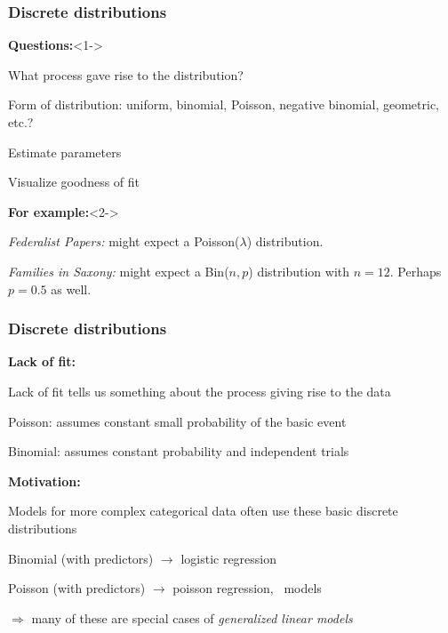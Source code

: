 \begin{frame}
  \frametitle{Discrete distributions}  

  \begin{block}{\large\bfseries Questions:}<1->
  	 \begin{itemize*}
  	 \item What process gave rise to the distribution?
  	 \item Form of distribution: uniform, binomial,
  	  Poisson, negative binomial, geometric, etc.?
  	 \item Estimate parameters
  	 \item Visualize goodness of fit
  	 \end{itemize*}
   \end{block}
  \begin{exampleblock}{\large\bfseries For example:}<2->
  	 \begin{itemize*}
  	 \item \emph{Federalist Papers:}  might expect a Poisson($\lambda$) distribution.
  	 \item \emph{Families in Saxony:}  might expect a Bin($n, p$) distribution 
  	 with $n=12$. Perhaps $p=0.5$ as well.
  	 \end{itemize*}
   \end{exampleblock}

\end{frame}

\begin{frame}
  \frametitle{Discrete distributions}  

  \begin{block}{\large\bfseries Lack of fit:}
	 \begin{itemize*}
     \item Lack of fit tells us something about the process giving rise to the data
     \item Poisson:  assumes constant small probability of the basic event
     \item Binomial: assumes constant probability and independent trials   
	 \end{itemize*}
  \end{block}

  \begin{exampleblock}{\large\bfseries Motivation:}
	 \begin{itemize*}
	   \item Models for more complex categorical data often use these basic discrete distributions
	   \item Binomial (with predictors) $\rightarrow$ logistic regression
	   \item Poisson (with predictors) $\rightarrow$ poisson regression, \loglin\ models 
	   \item $\Rightarrow$ many of these are special cases of \emph{generalized linear models}
	 \end{itemize*}

   \end{exampleblock}

\end{frame}

